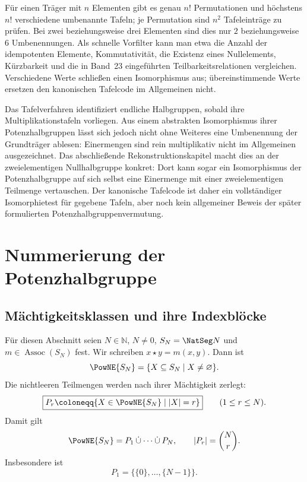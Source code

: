 \documentclass[main.tex]{subfiles}
\begin{document}
Für einen Träger mit \(n\) Elementen gibt es genau \(n!\) Permutationen und
höchstens \(n!\) verschiedene umbenannte Tafeln; je Permutation sind \(n^2\)
Tafeleinträge zu prüfen.  Bei
zwei beziehungsweise drei Elementen sind dies nur \(2\) beziehungsweise
\(6\) Umbenennungen.  Als schnelle Vorfilter kann man etwa die Anzahl der
idempotenten Elemente, Kommutativität, die Existenz eines Nullelements,
Kürzbarkeit und die in Band~23 eingeführten Teilbarkeitsrelationen
vergleichen.  Verschiedene Werte schließen einen Isomorphismus aus;
übereinstimmende Werte ersetzen den kanonischen Tafelcode im Allgemeinen
nicht.

\begin{remark}
Das Tafelverfahren identifiziert endliche Halbgruppen, sobald ihre
Multiplikationstafeln vorliegen.  Aus einem abstrakten Isomorphismus ihrer
Potenzhalbgruppen lässt sich jedoch nicht ohne Weiteres eine Umbenennung der
Grundträger ablesen: Einermengen sind rein multiplikativ nicht im
Allgemeinen ausgezeichnet.  Das abschließende Rekonstruktionskapitel macht
dies an der zweielementigen Nullhalbgruppe konkret: Dort kann sogar ein
Isomorphismus der Potenzhalbgruppe auf sich selbst eine Einermenge mit einer
zweielementigen Teilmenge vertauschen.  Der kanonische Tafelcode ist daher
ein vollständiger Isomorphietest für gegebene Tafeln, aber noch kein
allgemeiner Beweis der später formulierten Potenzhalbgruppenvermutung.
\end{remark}

\section{Nummerierung der Potenzhalbgruppe}

\subsection{Mächtigkeitsklassen und ihre Indexblöcke}

Für diesen Abschnitt seien \(N\in\mathbb N\), \(N\neq0\),
\(S_N=\NatSeg N\) und \(m\in\operatorname{Assoc}(S_N)\) fest.  Wir
schreiben \(x\star y=m(x,y)\).  Dann ist
\[
  \PowNE{S_N}
  =
  \{X\subseteq S_N\mid X\neq\varnothing\}.
\]
Die nichtleeren Teilmengen werden nach ihrer Mächtigkeit zerlegt:
\[
  \boxed{
  P_r
  \coloneqq
  \{X\in\PowNE{S_N}\mid |X|=r\}}
  \qquad(1\leq r\leq N).
\]
Damit gilt
\[
  \PowNE{S_N}
  =
  P_1\mathbin{\dot\cup}\cdots\mathbin{\dot\cup}P_N,
  \qquad
  |P_r|=\binom{N}{r}.
\]
Insbesondere ist
\[
  P_1=\bigl\{\{0\},\ldots,\{N-1\}\bigr\}.
\]
\end{document}
